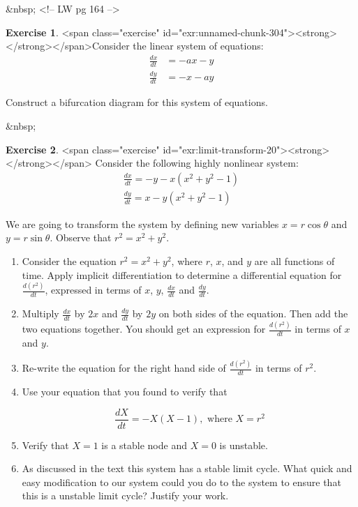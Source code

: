 \documentclass[
]{book}
\theoremstyle{definition}
\theoremstyle{definition}
\theoremstyle{definition}
\newtheorem{exercise}{Exercise}[chapter]
\theoremstyle{remark}
\begin{document}
&nbsp;
<!-- LW pg 164 -->
\begin{exercise}
<span class="exercise" id="exr:unnamed-chunk-304"><strong>\label{exr:unnamed-chunk-304} </strong></span>Consider the linear system of equations:
    \begin{align*}
\frac{dx}{dt}&=-ax-y \\
\frac{dy}{dt} &= -x-ay
\end{align*}

Construct a bifurcation diagram for this system of equations.
\end{exercise}
&nbsp;

\begin{exercise}
<span class="exercise" id="exr:limit-transform-20"><strong>\label{exr:limit-transform-20} </strong></span> Consider the following highly nonlinear system:
\begin{align*}
\frac{dx}{dt} =-y-x(x^2+y^2-1) \\
\frac{dy}{dt}=x-y(x^2+y^2-1)
\end{align*}

We are going to transform the system by defining new variables $x=r \cos \theta$ and $y=r \sin \theta$.  Observe that $r^2=x^2+y^2$.

\begin{enumerate}
\item Consider the equation $r^2=x^2+y^2$, where $r$, $x$, and $y$ are all functions of time. Apply implicit differentiation to determine a differential equation for $\displaystyle \frac{d(r^{2})}{dt}$, expressed in terms of $x$, $y$, $\displaystyle \frac{dx}{dt}$ and $\displaystyle \frac{dy}{dt}$.
\item Multiply $\frac{dx}{dt}$ by $2x$ and $\frac{dy}{dt}$ by $2y$ on both sides of the equation.  Then add the two equations together.  You should get an expression for $\displaystyle \frac{d(r^{2})}{dt}$ in terms of $x$ and $y$.
\item Re-write the equation for the right hand side of $\displaystyle \frac{d(r^{2})}{dt}$ in terms of $r^{2}$.

\item Use your equation that you found to verify that 

\begin{equation}
\frac{dX}{dt} = -X(X-1), \mbox{ where } X=r^{2}
\end{equation}

\item Verify that $X=1$ is a stable node and $X=0$ is unstable.
\item As discussed in the text this system has a stable limit cycle. What quick and easy modification to our system could you do to the system to ensure that this is a unstable limit cycle?  Justify your work.
\end{enumerate}
\end{exercise}
\end{document}
